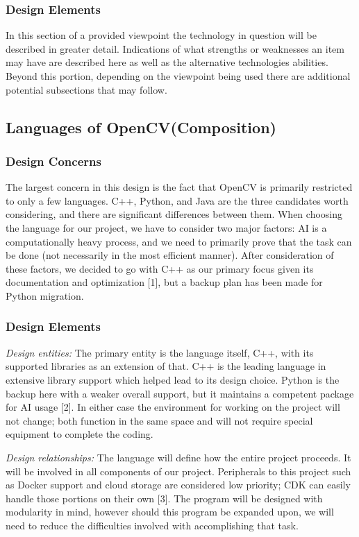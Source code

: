 \documentclass[onecolumn, draftclsnofoot,10pt, compsoc]{IEEEtran}
\begin{document}
\subsubsection{Design Elements}
In this section of a provided viewpoint the technology in question will be described in greater detail. Indications of what strengths or weaknesses an item may have are described here as well as the alternative technologies abilities. Beyond this portion, depending on the viewpoint being used there are additional potential subsections that may follow.

\subsection{Languages of OpenCV(Composition)}
\subsubsection{Design Concerns}
The largest concern in this design is the fact that OpenCV is primarily restricted to only a few languages. C++, Python, and Java are the three candidates worth considering, and there are significant differences between them. When choosing the language for our project, we have to consider two major factors: AI is a computationally heavy process, and we need to primarily prove that the task can be done (not necessarily in the most efficient manner). After consideration of these factors, we decided to go with C++ as our primary focus given its documentation and optimization [1], but a backup plan has been made for Python migration.

\subsubsection{Design Elements}
	\emph{Design entities:} 
The primary entity is the language itself, C++, with its supported libraries as an extension of that. C++ is the leading language in extensive library support which helped lead to its design choice. Python is the backup here with a weaker overall support, but it maintains a competent package for AI usage [2]. In either case the environment for working on the project will not change; both function in the same space and will not require special equipment to complete the coding.

		\emph{Design relationships:}
The language will define how the entire project proceeds. It will be involved in all components of our project. Peripherals to this project such as Docker support and cloud storage are considered low priority; CDK can easily handle those portions on their own [3]. The program will be designed with modularity in mind, however should this program be expanded upon, we will need to reduce the difficulties involved with accomplishing that task.
\end{document}

